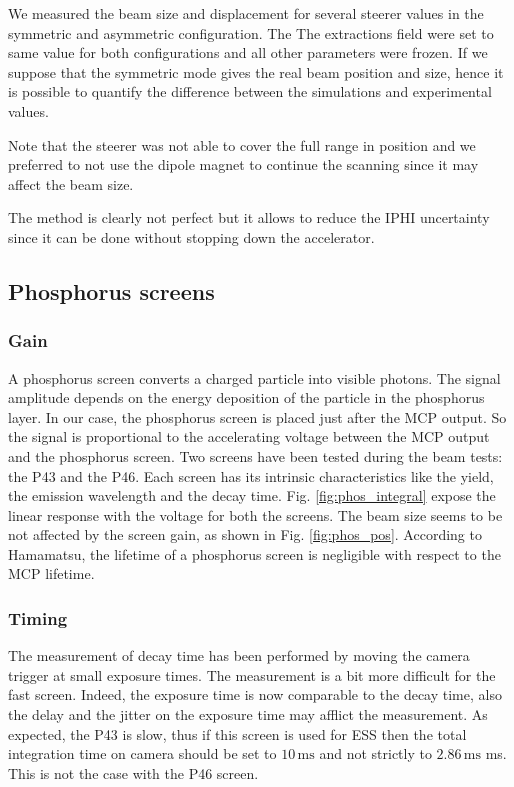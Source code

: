 \begin{refsection}
  We measured the beam size and displacement for several steerer values in the symmetric and asymmetric configuration. The 
  The extractions field were set to same value for both configurations and all other parameters were frozen. If we suppose that the symmetric mode gives the real beam position and size, hence it is possible to quantify the difference between the simulations and experimental values.


  Note that the steerer was not able to cover the full range in position and we preferred to not use the dipole magnet to continue the scanning since it may affect the beam size.
  
  The method is clearly not perfect but it allows to reduce the IPHI uncertainty since it can be done without stopping down the accelerator.

  \subsection{Phosphorus screens}
  \subsubsection{Gain}
  A phosphorus screen converts a charged particle into visible photons.
  The signal amplitude depends on the energy deposition of the particle in the phosphorus layer. In our case, the phosphorus screen is placed just after the MCP output. So the signal is proportional to the accelerating voltage between the MCP output and the phosphorus screen. Two screens have been tested during the beam tests: the P43 and the P46. Each screen has its intrinsic characteristics like the yield, the emission wavelength and the decay time. Fig. \ref{fig:phos_integral} expose the linear response with the voltage for both the screens. The beam size seems to be not affected by the screen gain, as shown in Fig. \ref{fig:phos_pos}. According to Hamamatsu, the lifetime of a phosphorus screen is negligible with respect to the MCP lifetime.

  
  

  \subsubsection{Timing}
  The measurement of decay time has been performed by moving the camera trigger at small exposure times. The measurement is a bit more difficult for the fast screen. Indeed, the exposure time is now comparable to the decay time, also the delay and the jitter on the exposure time may afflict the measurement. As expected, the P43 is slow, thus if this screen is used for ESS then the total integration time on camera should be set to $10\,\mathrm{ms}$ and not strictly to $2.86\,\mathrm{ms}$ ms. This is not the case with the P46 screen.
  


\end{refsection}
